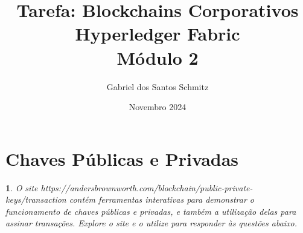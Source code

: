\documentclass[letterpaper,11pt,leqno]{article}
\newtheorem{problem}{\refstepcounter{problemcount}{Problema}}
\begin{document}
\title{Tarefa: Blockchains Corporativos\\ Hyperledger Fabric\\ Módulo 2}

\author{Gabriel dos Santos Schmitz}

\date{Novembro 2024}

\begin{titlepage}

	\maketitle

\end{titlepage}

\section{Chaves Públicas e Privadas}

\begin{problem}
O site https://andersbrownworth.com/blockchain/public-private-keys/transaction
contém ferramentas interativas para demonstrar o funcionamento de chaves
públicas e privadas, e também a utilização delas para assinar transações.
Explore o site e o utilize para responder às questões abaixo.
\end{problem}
\end{document}
